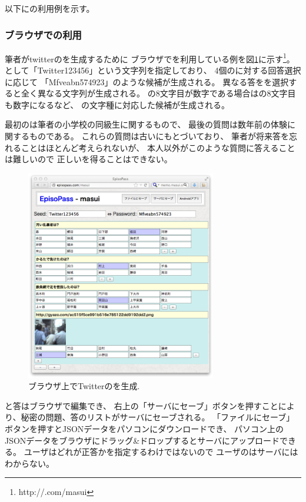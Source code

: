 \documentclass[twoside]{wiss}
\begin{document}
以下に{\EP}の利用例を示す。

\subsubsection{ブラウザでの利用}

筆者がtwitterの{\PW}を生成するために
ブラウザで{\EP}を利用している例を図\ref{web1}に示す\footnote{
  \textsf{http://{\EP}.com/masui}
}。
{\SS}として「\textsf{Twitter123456}」という文字列を指定しており、
4個の{\SQ}に対する回答選択に応じて
「\textsf{Mfveabn574923}」のような{\PW}候補が生成される。
異なる答をを選択すると全く異なる文字列が生成される。
{\SS}の8文字目が数字である場合は{\PW}の8文字目も数字になるなど、
{\SS}の文字種に対応した{\PW}候補が生成される。

最初の{\SQ}は筆者の小学校の同級生に関するもので、
最後の質問は数年前の体験に関するものである。
これらの質問は古い{\EM}にもとづいており、
筆者が将来答を忘れることはほとんど考えられないが、
本人以外がこのような質問に答えることは難しいので
正しい{\PW}を得ることはできない。

\begin{figure}[H]
\centerline{\includegraphics[width=83mm,bb=0 0 718 796]{figures/785ff09b4233804d2ec89c3af71ee5d0.png}}
\caption{ブラウザ上でTwitterの{\PW}を生成.}
\label{web1}
\end{figure}

{\SQ}と答はブラウザで編集でき、
右上の「サーバにセーブ」ボタンを押すことにより{\SS}、秘密の問題、答のリストがサーバにセーブされる。
「ファイルにセーブ」ボタンを押すとJSONデータをパソコンにダウンロードでき、
パソコン上のJSONデータをブラウザにドラッグ\&ドロップするとサーバにアップロードできる。
ユーザはどれが正答かを指定するわけではないので
ユーザの{\PW}はサーバにはわからない。
\end{document}
